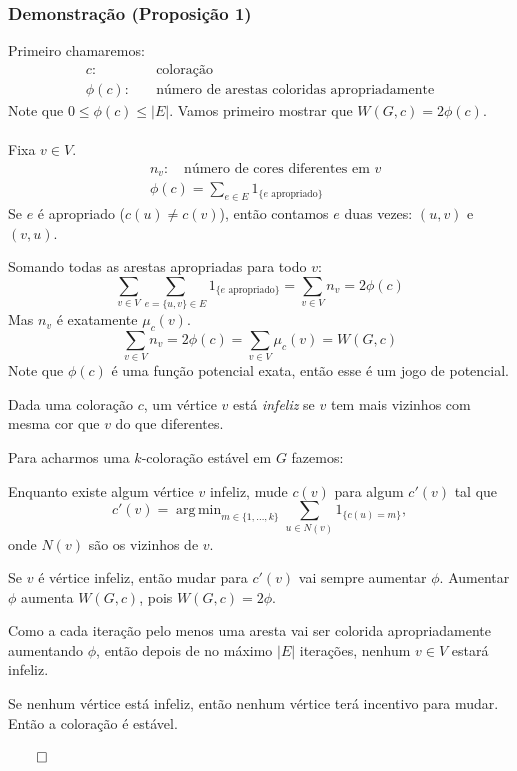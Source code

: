 \documentclass{beamer}
\DeclareMathOperator*{\argmin}{arg\,min}
\theoremstyle{plain}
\begin{document}
\begin{frame}
  \frametitle{Demonstração (Proposição 1)}
  Primeiro chamaremos:
  \begin{align*}
    c:\quad &\text{coloração}\\
    \phi(c):\quad &\text{número de arestas coloridas apropriadamente}
  \end{align*}
  Note que $0\leq \phi(c)\leq |E|$. Vamos primeiro mostrar que $W(G,c)=2\phi(c)$.\\~\\
  Fixa $v\in V$.
  \begin{align*}
    &n_v:\quad \text{número de cores diferentes em $v$}\\
    &\phi(c)=\sum_{e\in E}1_{\{e\text{ apropriado}\}}
  \end{align*}
  Se $e$ é apropriado ($c(u)\neq c(v)$), então contamos $e$ duas vezes: $(u,v)$ e $(v,u)$.
\end{frame}

\begin{frame}
  Somando todas as arestas apropriadas para todo $v$:
  \begin{equation*}
    \sum_{v\in V}\sum_{e=\{u,v\}\in E}1_{\{e\text{ apropriado}\}}=\sum_{v\in V}n_v=2\phi(c)
  \end{equation*}
  Mas $n_v$ é exatamente $\mu_c(v)$.
  \begin{equation*}
    \sum_{v\in V}n_v=2\phi(c)=\sum_{v\in V}\mu_c(v)=W(G,c)
  \end{equation*}
  Note que $\phi(c)$ é uma função potencial exata, então esse é um jogo de potencial.
\end{frame}

\begin{frame}
  Dada uma coloração $c$, um vértice $v$ está \textit{infeliz} se $v$ tem mais vizinhos com mesma
  cor que $v$ do que diferentes.

  Para acharmos uma $k$-coloração estável em $G$ fazemos:

  Enquanto existe algum vértice $v$ infeliz, mude $c(v)$ para algum $c'(v)$ tal que
  \begin{equation*}
    c'(v)=\argmin_{m\in\{1,\ldots,k\}}\sum_{u\in N(v)}1_{\{c(u)=m\}},
  \end{equation*}
  onde $N(v)$ são os vizinhos de $v$.
\end{frame}

\begin{frame}
  Se $v$ é vértice infeliz, então mudar para $c'(v)$ vai sempre aumentar $\phi$. Aumentar $\phi$
  aumenta $W(G,c)$, pois $W(G,c)=2\phi$.

  Como a cada iteração pelo menos uma aresta vai ser colorida apropriadamente aumentando $\phi$,
  então depois de no máximo $|E|$ iterações, nenhum $v\in V$ estará infeliz.

  Se nenhum vértice está infeliz, então nenhum vértice terá incentivo para mudar. Então a coloração
  é estável.

  \hfill$\qed$
\end{frame}
\end{document}
